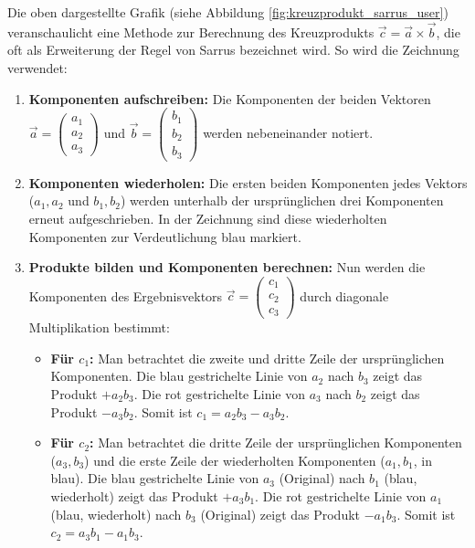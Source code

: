 Die oben dargestellte Grafik (siehe Abbildung \ref{fig:kreuzprodukt_sarrus_user}) veranschaulicht eine Methode zur Berechnung des Kreuzprodukts \(\vec{c} = \vec{a} \times \vec{b}\), die oft als Erweiterung der Regel von Sarrus bezeichnet wird. So wird die Zeichnung verwendet:

\begin{enumerate}
    \item \textbf{Komponenten aufschreiben:} Die Komponenten der beiden Vektoren \(\vec{a} = \begin{pmatrix} a_1 \\ a_2 \\ a_3 \end{pmatrix}\) und \(\vec{b} = \begin{pmatrix} b_1 \\ b_2 \\ b_3 \end{pmatrix}\) werden nebeneinander notiert.
    \item \textbf{Komponenten wiederholen:} Die ersten beiden Komponenten jedes Vektors (\(a_1, a_2\) und \(b_1, b_2\)) werden unterhalb der ursprünglichen drei Komponenten erneut aufgeschrieben. In der Zeichnung sind diese wiederholten Komponenten zur Verdeutlichung blau markiert.
    \item \textbf{Produkte bilden und Komponenten berechnen:} Nun werden die Komponenten des Ergebnisvektors \(\vec{c} = \begin{pmatrix} c_1 \\ c_2 \\ c_3 \end{pmatrix}\) durch diagonale Multiplikation bestimmt:
    \begin{itemize}
        \item \textbf{Für \(c_1\):}
        Man betrachtet die zweite und dritte Zeile der ursprünglichen Komponenten.
        Die blau gestrichelte Linie von \(a_2\) nach \(b_3\) zeigt das Produkt \(+a_2 b_3\).
        Die rot gestrichelte Linie von \(a_3\) nach \(b_2\) zeigt das Produkt \(-a_3 b_2\).
        Somit ist \(c_1 = a_2 b_3 - a_3 b_2\).

        \item \textbf{Für \(c_2\):}
        Man betrachtet die dritte Zeile der ursprünglichen Komponenten (\(a_3, b_3\)) und die erste Zeile der wiederholten Komponenten (\(a_1, b_1\), in blau).
        Die blau gestrichelte Linie von \(a_3\) (Original) nach \(b_1\) (blau, wiederholt) zeigt das Produkt \(+a_3 b_1\).
        Die rot gestrichelte Linie von \(a_1\) (blau, wiederholt) nach \(b_3\) (Original) zeigt das Produkt \(-a_1 b_3\).
        Somit ist \(c_2 = a_3 b_1 - a_1 b_3\).


\end{itemize}
\end{enumerate}
